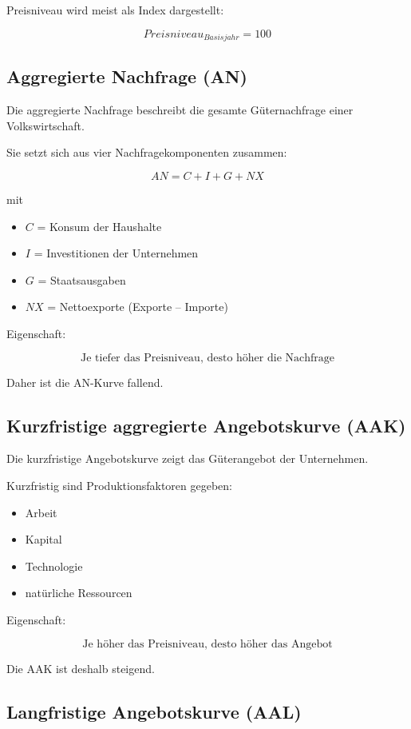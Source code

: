 Preisniveau wird meist als Index dargestellt:

\[
    Preisniveau_{Basisjahr} = 100
\]


\subsection{Aggregierte Nachfrage (AN)}

Die aggregierte Nachfrage beschreibt die gesamte Güternachfrage einer Volkswirtschaft.

Sie setzt sich aus vier Nachfragekomponenten zusammen:

\[
    AN = C + I + G + NX
\]

mit

\begin{itemize}
    \item $C$ = Konsum der Haushalte
    \item $I$ = Investitionen der Unternehmen
    \item $G$ = Staatsausgaben
    \item $NX$ = Nettoexporte (Exporte – Importe)
\end{itemize}

Eigenschaft:

\[
    \text{Je tiefer das Preisniveau, desto höher die Nachfrage}
\]

Daher ist die AN-Kurve fallend.


\subsection{Kurzfristige aggregierte Angebotskurve (AAK)}

Die kurzfristige Angebotskurve zeigt das Güterangebot der Unternehmen.

Kurzfristig sind Produktionsfaktoren gegeben:

\begin{itemize}
    \item Arbeit
    \item Kapital
    \item Technologie
    \item natürliche Ressourcen
\end{itemize}

Eigenschaft:

\[
    \text{Je höher das Preisniveau, desto höher das Angebot}
\]

Die AAK ist deshalb steigend.


\subsection{Langfristige Angebotskurve (AAL)}

